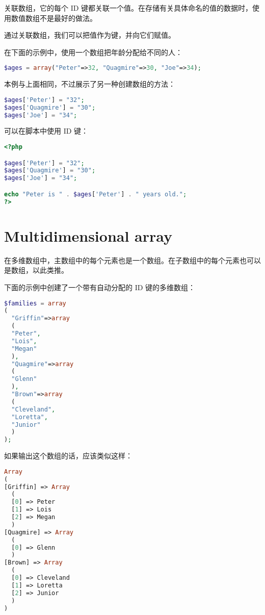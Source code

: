 关联数组，它的每个 ID 键都关联一个值。在存储有关具体命名的值的数据时，使用数值数组不是最好的做法。

通过关联数组，我们可以把值作为键，并向它们赋值。

在下面的示例中，使用一个数组把年龄分配给不同的人：


\begin{lstlisting}[language=PHP]
$ages = array("Peter"=>32, "Quagmire"=>30, "Joe"=>34);
\end{lstlisting}

本例与上面相同，不过展示了另一种创建数组的方法：

\begin{lstlisting}[language=PHP]
$ages['Peter'] = "32";
$ages['Quagmire'] = "30";
$ages['Joe'] = "34";
\end{lstlisting}



可以在脚本中使用 ID 键：

\begin{lstlisting}[language=PHP]
<?php

$ages['Peter'] = "32";
$ages['Quagmire'] = "30";
$ages['Joe'] = "34";

echo "Peter is " . $ages['Peter'] . " years old.";
?>
\end{lstlisting}

\section{Multidimensional array}



在多维数组中，主数组中的每个元素也是一个数组。在子数组中的每个元素也可以是数组，以此类推。


下面的示例中创建了一个带有自动分配的 ID 键的多维数组：


\begin{lstlisting}[language=PHP]
$families = array
(
  "Griffin"=>array
  (
  "Peter",
  "Lois",
  "Megan"
  ),
  "Quagmire"=>array
  (
  "Glenn"
  ),
  "Brown"=>array
  (
  "Cleveland",
  "Loretta",
  "Junior"
  )
);
\end{lstlisting}

如果输出这个数组的话，应该类似这样：


\begin{lstlisting}[language=PHP]
Array
(
[Griffin] => Array
  (
  [0] => Peter
  [1] => Lois
  [2] => Megan
  )
[Quagmire] => Array
  (
  [0] => Glenn
  )
[Brown] => Array
  (
  [0] => Cleveland
  [1] => Loretta
  [2] => Junior
  )
)
\end{lstlisting}

